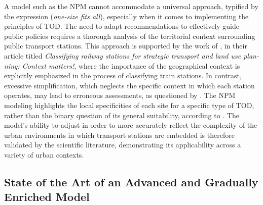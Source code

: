 \begin{refsegment}
A model such as the \acrshort{NPM} cannot accommodate a universal approach, typified by the expression  (\textsl{one-size fits all}), especially when it comes to implementing the principles of \acrshort{TOD}. The need to adapt recommendations to effectively guide public policies requires a thorough analysis of the territorial context surrounding public transport stations. This approach is supported by the work of \textcolor{blue}{\textcite[678-679]{zemp_classifying_2011}}, in their article titled \foreignlanguage{english}{\textsl{Classifying railway stations for strategic transport and land use planning: Context matters!}}, where the importance of the geographical context is explicitly emphasized in the process of classifying train stations. In contrast, excessive simplification, which neglects the specific context in which each station operates, may lead to erroneous assessments, as questioned by \textcolor{blue}{\textcite[2]{cao_coordination_2020}}. The \acrshort{NPM} modeling highlights the local specificities of each site for a specific type of \acrshort{TOD}, rather than the binary question of its general suitability, according to \textcolor{blue}{\textcite[55]{kamruzzaman_advance_2014}}. The model's ability to adjust in order to more accurately reflect the complexity of the urban environments in which transport stations are embedded is therefore validated by the scientific literature, demonstrating its applicability across a variety of urban contexts.%

\subsection{State of the Art of an Advanced and Gradually Enriched Model
    \label{chap6:litterature-etat-art}
    }


\end{refsegment}

